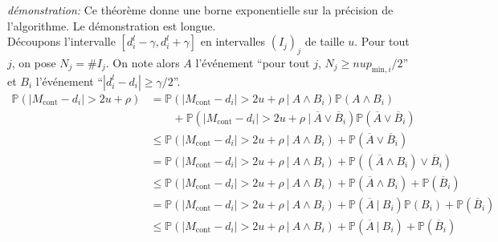 \textit{démonstration:} Ce théorème donne une borne exponentielle sur la précision de l'algorithme. Le démonstration est longue.\\

Découpons l'intervalle \([d_i^l - \gamma, d_i^l + \gamma]\) en intervalles \((I_j)_j\) de taille \(u\). Pour tout \(j\), on pose \(N_j = \#I_j\). On note alors \(A\) l'événement ``pour tout \(j\), \(N_j \geq nup_{\text{min}, i}/2\)'' et \(B_i\) l'événement ``\(|d_i^l - d_i| \geq \gamma/2\)''.\\
\begin{align*}
    \mathbb P\left( |M_{\text{cont}} - d_i| > 2u + \rho \right) & = \mathbb P\left( |M_{\text{cont}} - d_i| > 2u + \rho \ | \ A \wedge B_i\right)\mathbb P\left( A \wedge B_i \right)\\
    & \quad \quad  + \mathbb P\left( |M_{\text{cont}} - d_i| > 2u + \rho \ | \ \overline A \vee \overline B_i\right) \mathbb P \left( \overline A \vee \overline B_i \right)\\
    & \leq \mathbb P\left( |M_{\text{cont}} - d_i| > 2u + \rho \ | \ A \wedge B_i\right) +   \mathbb P \left( \overline A \vee \overline B_i \right)\\
    & = \mathbb P\left( |M_{\text{cont}} - d_i| > 2u + \rho \ | \ A \wedge B_i\right) +   \mathbb P \left( (\overline A \wedge B_i) \vee \overline B_i \right)\\
    & \leq \mathbb P\left( |M_{\text{cont}} - d_i| > 2u + \rho \ | \ A \wedge B_i\right) +   \mathbb P \left( \overline A \wedge B_i\right) + \mathbb P \left( \overline B_i \right)\\
    & = \mathbb P\left( |M_{\text{cont}} - d_i| > 2u + \rho \ | \ A \wedge B_i\right) +   \mathbb P \left( \overline A \ |\ B_i\right)\mathbb P (B_i) + \mathbb P \left( \overline B_i \right)\\
    & \leq \mathbb P\left( |M_{\text{cont}} - d_i| > 2u + \rho \ | \ A \wedge B_i\right) +   \mathbb P \left( \overline A \ |\ B_i\right) + \mathbb P \left( \overline B_i \right)\\
\end{align*}


